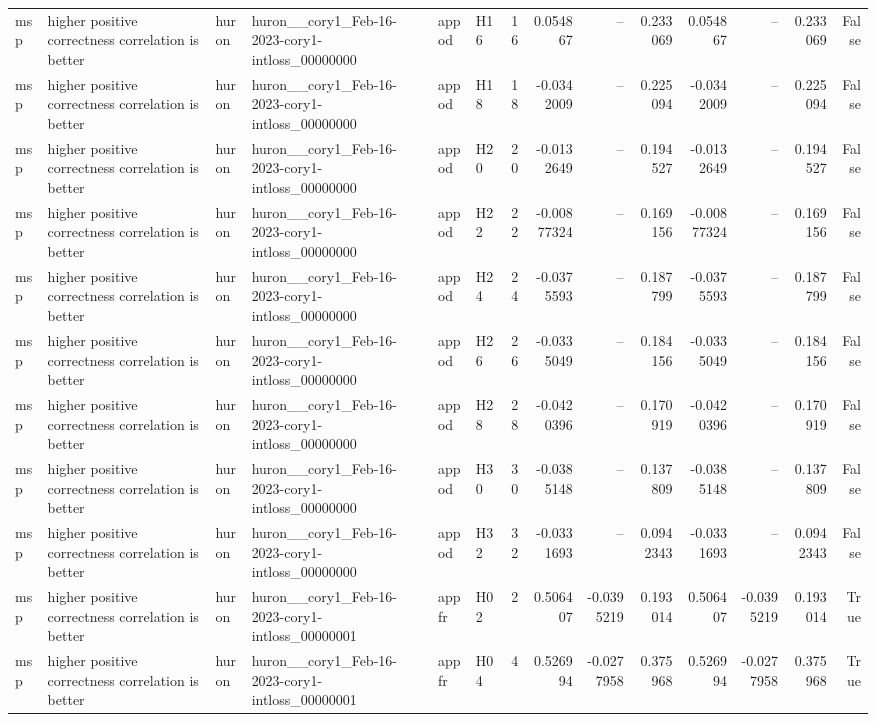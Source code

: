 \begin{longtable}{llllllrrrrrrrr}
msp & higher positive correctness correlation is better & huron & huron\_\_cory1\_Feb-16-2023-cory1-intloss\_00000000 & appod & H16 & 16 & 0.054867 & -- & 0.233069 & 0.054867 & -- & 0.233069 & False \\
msp & higher positive correctness correlation is better & huron & huron\_\_cory1\_Feb-16-2023-cory1-intloss\_00000000 & appod & H18 & 18 & -0.0342009 & -- & 0.225094 & -0.0342009 & -- & 0.225094 & False \\
msp & higher positive correctness correlation is better & huron & huron\_\_cory1\_Feb-16-2023-cory1-intloss\_00000000 & appod & H20 & 20 & -0.0132649 & -- & 0.194527 & -0.0132649 & -- & 0.194527 & False \\
msp & higher positive correctness correlation is better & huron & huron\_\_cory1\_Feb-16-2023-cory1-intloss\_00000000 & appod & H22 & 22 & -0.00877324 & -- & 0.169156 & -0.00877324 & -- & 0.169156 & False \\
msp & higher positive correctness correlation is better & huron & huron\_\_cory1\_Feb-16-2023-cory1-intloss\_00000000 & appod & H24 & 24 & -0.0375593 & -- & 0.187799 & -0.0375593 & -- & 0.187799 & False \\
msp & higher positive correctness correlation is better & huron & huron\_\_cory1\_Feb-16-2023-cory1-intloss\_00000000 & appod & H26 & 26 & -0.0335049 & -- & 0.184156 & -0.0335049 & -- & 0.184156 & False \\
msp & higher positive correctness correlation is better & huron & huron\_\_cory1\_Feb-16-2023-cory1-intloss\_00000000 & appod & H28 & 28 & -0.0420396 & -- & 0.170919 & -0.0420396 & -- & 0.170919 & False \\
msp & higher positive correctness correlation is better & huron & huron\_\_cory1\_Feb-16-2023-cory1-intloss\_00000000 & appod & H30 & 30 & -0.0385148 & -- & 0.137809 & -0.0385148 & -- & 0.137809 & False \\
msp & higher positive correctness correlation is better & huron & huron\_\_cory1\_Feb-16-2023-cory1-intloss\_00000000 & appod & H32 & 32 & -0.0331693 & -- & 0.0942343 & -0.0331693 & -- & 0.0942343 & False \\
msp & higher positive correctness correlation is better & huron & huron\_\_cory1\_Feb-16-2023-cory1-intloss\_00000001 & appfr & H02 & 2 & 0.506407 & -0.0395219 & 0.193014 & 0.506407 & -0.0395219 & 0.193014 & True \\
msp & higher positive correctness correlation is better & huron & huron\_\_cory1\_Feb-16-2023-cory1-intloss\_00000001 & appfr & H04 & 4 & 0.526994 & -0.0277958 & 0.375968 & 0.526994 & -0.0277958 & 0.375968 & True \\

\end{longtable}
